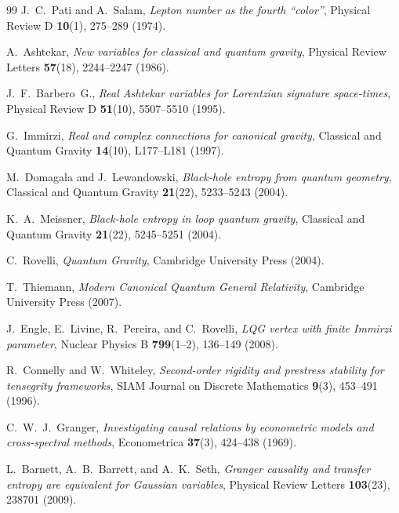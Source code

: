 \documentclass[11pt,a4paper]{article}
\theoremstyle{plain}
\theoremstyle{definition}
\theoremstyle{remark}
\begin{document}
\begin{thebibliography}{99}
J.~C.~Pati and A.~Salam,
\textit{Lepton number as the fourth ``color''},
Physical Review D \textbf{10}(1), 275--289 (1974).

A.~Ashtekar,
\textit{New variables for classical and quantum gravity},
Physical Review Letters \textbf{57}(18), 2244--2247 (1986).

J.~F.~Barbero~G.,
\textit{Real Ashtekar variables for Lorentzian signature space-times},
Physical Review D \textbf{51}(10), 5507--5510 (1995).

G.~Immirzi,
\textit{Real and complex connections for canonical gravity},
Classical and Quantum Gravity \textbf{14}(10), L177--L181 (1997).

M.~Domagala and J.~Lewandowski,
\textit{Black-hole entropy from quantum geometry},
Classical and Quantum Gravity \textbf{21}(22), 5233--5243 (2004).

K.~A.~Meissner,
\textit{Black-hole entropy in loop quantum gravity},
Classical and Quantum Gravity \textbf{21}(22), 5245--5251 (2004).

C.~Rovelli,
\textit{Quantum Gravity},
Cambridge University Press (2004).

T.~Thiemann,
\textit{Modern Canonical Quantum General Relativity},
Cambridge University Press (2007).

J.~Engle, E.~Livine, R.~Pereira, and C.~Rovelli,
\textit{LQG vertex with finite Immirzi parameter},
Nuclear Physics B \textbf{799}(1--2), 136--149 (2008).

R.~Connelly and W.~Whiteley,
\textit{Second-order rigidity and prestress stability for tensegrity frameworks},
SIAM Journal on Discrete Mathematics \textbf{9}(3), 453--491 (1996).

C.~W.~J.~Granger,
\textit{Investigating causal relations by econometric models and cross-spectral methods},
Econometrica \textbf{37}(3), 424--438 (1969).

L.~Barnett, A.~B.~Barrett, and A.~K.~Seth,
\textit{Granger causality and transfer entropy are equivalent for Gaussian variables},
Physical Review Letters \textbf{103}(23), 238701 (2009).


\end{thebibliography}
\end{document}
